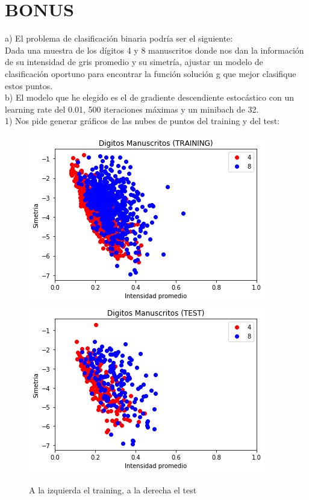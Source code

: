 \documentclass[12pt]{article}
\begin{document}
\section{BONUS}
a) El problema de clasificación binaria podría ser el siguiente:\\
Dada una muestra de los dígitos 4 y 8 manuscritos donde nos dan la información de su intensidad de gris promedio y su simetría, ajustar un modelo de clasificación oportuno para encontrar la función solución g que mejor clasifique estos puntos.\\
b) El modelo que he elegido es el de gradiente descendiente estocástico con un learning rate del 0.01, 500 iteraciones máximas y un minibach de 32.\\
1) Nos pide generar gráficos de las nubes de puntos del training y del test: \\
\begin{figure}[h]
\centering
\includegraphics[scale=0.45]{Images/EjB1.png} 
\includegraphics[scale=0.45]{Images/EjB2.png} 
\caption{A la izquierda el training, a la derecha el test}
\label{etiqueta}
\end{figure}
\\
\end{document}
